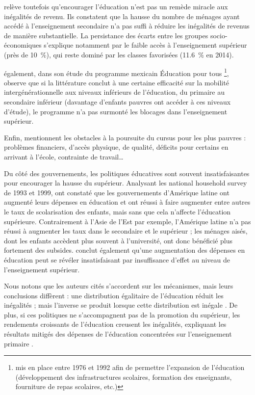 \documentclass[pagesize, twoside=off, bibliography=totoc, DIV=calc, fontsize=12pt, a4paper, french]{scrartcl}
\begin{document}
 relève toutefois qu’encourager l’éducation n’est pas un remède miracle aux inégalités de revenu. Ils constatent que la hausse du nombre de ménages ayant accédé à l’enseignement secondaire n’a pas suffi à réduire les inégalités de revenus de manière substantielle. La persistance des écarts entre les groupes socio-économiques s’explique notamment par le faible accès à l’enseignement supérieur (près de \SI{10}{\percent}), qui reste dominé par les classes favorisées (\SI{11.6}{\percent} en 2014). 

 également, dans son étude du programme mexicain \og{}Éducation pour tous\fg{} \footnote{\label{ft_mex} mis en place entre 1976 et 1992 afin de permettre \og{}l’expansion de l’éducation\fg{} (développement des infrastructures scolaires, formation des enseignants, fourniture de repas scolaires, etc.)}, observe que si la littérature conclut à une certaine efficacité sur la mobilité intergénérationnelle aux niveaux inférieurs de l’éducation, du primaire au secondaire inférieur (davantage d’enfants pauvres ont accéder à ces niveaux d’étude), le programme n’a pas surmonté les blocages dans l’enseignement supérieur.

Enfin, \citet{birdsall} mentionnent les obstacles à la poursuite du cursus pour les plus pauvres : problèmes financiers, d’accès physique, de qualité, déficits pour certains en arrivant à l’école, contrainte de travail…

Du côté des gouvernements, les politiques éducatives sont souvent insatisfaisantes pour encourager la hausse du supérieur. Analysant les \og{}national household survey\fg{} de 1993 et 1999, \citet{birdsall} ont constaté que les gouvernements d’Amérique latine ont augmenté leurs dépenses en éducation et ont réussi à faire augmenter entre autres le taux de scolarisation des enfants, mais sans que cela n’affecte l’éducation supérieure. Contrairement à l’Asie de l’Est par exemple, l’Amérique latine n’a pas réussi à augmenter les taux dans le secondaire et le supérieur ; les ménages aisés, dont les enfants accèdent plus souvent à l’université, ont donc bénéficié plus fortement des subsides.  conclut également qu’une augmentation des dépenses en éducation peut se révéler insatisfaisant par insuffisance d’effet au niveau de l'enseignement supérieur.

Nous notons que les auteurs cités s’accordent sur les mécanismes, mais leurs conclusions diffèrent : une distribution égalitaire de l’éducation réduit les inégalités \citep{tréjos} ; mais l’inverse se produit lorsque cette distribution est inégale \citep{birdall}. De plus, si ces politiques ne s’accompagnent pas de la promotion du supérieur, les rendements croissants de l’éducation creusent les inégalités, expliquant les résultats mitigés des dépenses de l'éducation concentrées sur l’enseignement primaire \citep{urbina_intergenerational_2018}.
\end{document}
